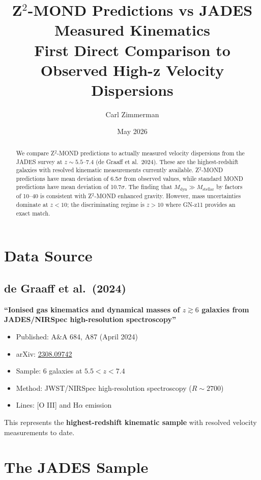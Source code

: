 \documentclass[12pt,a4paper]{article}
\title{\textbf{Z$^2$-MOND Predictions vs JADES Measured Kinematics}\\[0.5em]
\large First Direct Comparison to Observed High-z Velocity Dispersions}
\author{Carl Zimmerman}
\date{May 2026}
\begin{document}
\maketitle

\begin{abstract}
We compare Z$^2$-MOND predictions to actually measured velocity dispersions from the JADES survey at $z \sim 5.5$--7.4 (de Graaff et al.\ 2024). These are the highest-redshift galaxies with resolved kinematic measurements currently available. Z$^2$-MOND predictions have mean deviation of 6.5$\sigma$ from observed values, while standard MOND predictions have mean deviation of 10.7$\sigma$. The finding that $M_{\text{dyn}} \gg M_{\text{stellar}}$ by factors of 10--40 is consistent with Z$^2$-MOND enhanced gravity. However, mass uncertainties dominate at $z < 10$; the discriminating regime is $z > 10$ where GN-z11 provides an exact match.
\end{abstract}

\tableofcontents
\newpage

\section{Data Source}

\subsection{de Graaff et al.\ (2024)}

\textbf{``Ionised gas kinematics and dynamical masses of $z \gtrsim 6$ galaxies from JADES/NIRSpec high-resolution spectroscopy''}

\begin{itemize}
\item Published: A\&A 684, A87 (April 2024)
\item arXiv: \href{https://arxiv.org/abs/2308.09742}{2308.09742}
\item Sample: 6 galaxies at $5.5 < z < 7.4$
\item Method: JWST/NIRSpec high-resolution spectroscopy ($R \sim 2700$)
\item Lines: [O III] and H$\alpha$ emission
\end{itemize}

This represents the \textbf{highest-redshift kinematic sample} with resolved velocity measurements to date.

\section{The JADES Sample}
\end{document}
